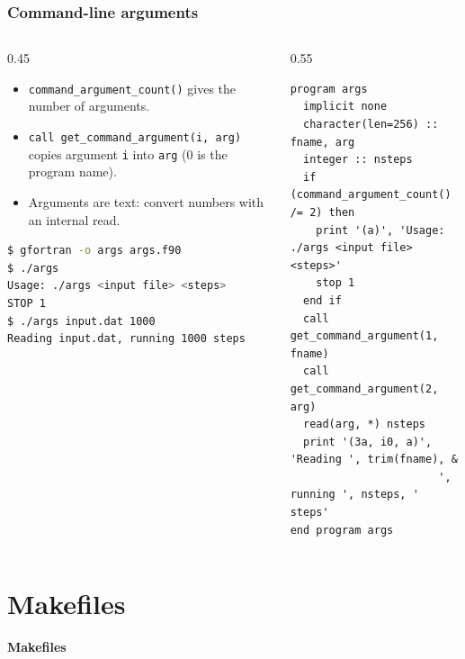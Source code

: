 \begin{frame}[fragile]
  \frametitle{Command-line arguments}
  \begin{columns}[T]
    \begin{column}{0.45\textwidth}
      \begin{itemize}
        \item \texttt{command\_argument\_count()} gives the number of arguments.
        \item \texttt{call get\_command\_argument(i, arg)} copies argument \texttt{i} into \texttt{arg} (0 is the program name).
        \item Arguments are text: convert numbers with an internal read.
      \end{itemize}
      \begin{lstlisting}[language=bash]
$ gfortran -o args args.f90
$ ./args
Usage: ./args <input file> <steps>
STOP 1
$ ./args input.dat 1000
Reading input.dat, running 1000 steps
      \end{lstlisting}
    \end{column}

    \begin{column}{0.55\textwidth}
      \begin{lstlisting}
program args
  implicit none
  character(len=256) :: fname, arg
  integer :: nsteps
  if (command_argument_count() /= 2) then
    print '(a)', 'Usage: ./args <input file> <steps>'
    stop 1
  end if
  call get_command_argument(1, fname)
  call get_command_argument(2, arg)
  read(arg, *) nsteps
  print '(3a, i0, a)', 'Reading ', trim(fname), &
                       ', running ', nsteps, ' steps'
end program args
      \end{lstlisting}
    \end{column}
  \end{columns}
\end{frame}


\section{Makefiles}

\begin{frame}
  \centering
  \Huge \textbf{Makefiles}
\end{frame}


